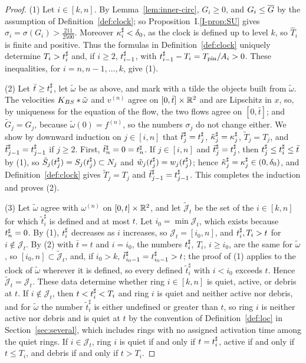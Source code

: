 \begin{proof}
(1) Let $i\in[k,n]$. By Lemma~\ref{lem:inner-circ}, $G_i\ge0$, and $G_i\le\overline{G}$ by
the assumption of Definition~\ref{def:clock}; so Proposition~I.\ref{I-prop:SU} gives
$\sigma_i=\sigma(G_i)>\frac{211}{2500}$. Moreover $\kappa^\sharp_i<\delta_0$, as the clock
is defined up to level $k$, so $\hat T_i$ is finite and positive. Thus the
formulas in Definition~\ref{def:clock} uniquely determine $T_i>t^\sharp_i$ and,
if $i\ge2$, $t^\sharp_{i-1}$, with $t^\sharp_{i-1}-T_i=T_{\mathrm{pin}}/A_i>0$.
These inequalities, for $i=n,n-1,\dots,k$,
give (1).

(2) Let $\bar t\ge t^\sharp_i$, let $\tilde\omega$ be as above, and mark with a tilde
the objects built from $\tilde\omega$. The velocities $K_{BS}\ast\tilde\omega$ and
$v^{(n)}$ agree on $[0,\bar t]\times\mathbb{R}^2$ and are Lipschitz in $x$, so, by
uniqueness for the equation of the flow, the two
flows agree on $[0,\bar t]$; and $\tilde G_j=G_j$, because
$\tilde\omega(0)=f^{(n)}$, so the numbers $\sigma_j$ do not change either. We show by downward induction on $j\in[i,n]$ that
$\tilde t^\sharp_j=t^\sharp_j$, $\tilde\kappa^\sharp_j=\kappa^\sharp_j$, $\tilde T_j=T_j$, and
$\tilde t^\sharp_{j-1}=t^\sharp_{j-1}$ if $j\ge2$. First, $\tilde t^\sharp_n=0=t^\sharp_n$.
If $j\in[i,n]$ and $\tilde t^\sharp_j=t^\sharp_j$, then $t^\sharp_j\le t^\sharp_i\le\bar t$ by (1), so
$\tilde S_j(t^\sharp_j)=S_j(t^\sharp_j)\subset N_j$ and $\tilde w_j(t^\sharp_j)=w_j(t^\sharp_j)$;
hence $\tilde\kappa^\sharp_j=\kappa^\sharp_j\in(0,\delta_0)$, and
Definition~\ref{def:clock} gives $\tilde T_j=T_j$ and
$\tilde t^\sharp_{j-1}=t^\sharp_{j-1}$. This completes the induction and proves (2).

(3) Let $\tilde\omega$ agree with $\omega^{(n)}$ on $[0,t]\times\mathbb{R}^2$, and let
$\tilde{\mathcal J}_t$ be the set of the $i\in[k,n]$ for which
$\tilde t^\sharp_i$ is defined and at most $t$. Let $i_0=\min\mathcal J_t$, which
exists because $t^\sharp_n=0$. By (1), $t^\sharp_i$ decreases as $i$ increases, so
$\mathcal J_t=[i_0,n]$, and $t^\sharp_i,T_i>t$
for $i\notin\mathcal J_t$. By (2) with $\bar t=t$ and $i=i_0$, the numbers
$t^\sharp_i$, $T_i$, $i\ge i_0$, are the same for $\tilde\omega$, so
$[i_0,n]\subset\tilde{\mathcal J}_t$, and, if $i_0>k$,
$\tilde t^\sharp_{i_0-1}=t^\sharp_{i_0-1}>t$; the proof of (1) applies to the clock
of $\tilde\omega$ wherever it is defined, so every defined $\tilde t^\sharp_i$ with $i<i_0$ exceeds
$t$. Hence $\tilde{\mathcal J}_t=\mathcal J_t$. These data determine whether
ring $i\in[k,n]$ is quiet, active, or debris at $t$. If $i\notin\mathcal J_t$, then $t<t^\sharp_i<T_i$ and ring
$i$ is quiet and neither active nor debris, and for $\tilde\omega$ the number
$\tilde t^\sharp_i$ is either undefined or greater than $t$, so ring $i$ is
neither active nor debris and is quiet at $t$ by the convention of
Definition~\ref{def:loc} in Section~\ref{sec:several}, which includes rings with
no assigned activation time among the quiet rings. If $i\in\mathcal J_t$, ring $i$ is
quiet if and only if $t=t^\sharp_i$, active if and only if $t\le T_i$, and debris if
and only if $t>T_i$.
\end{proof}
